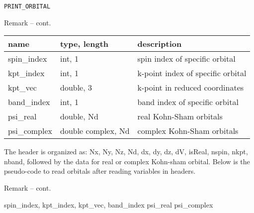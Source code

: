 \begin{frame}[allowframebreaks]{\texttt{PRINT\_ORBITAL}}
\begin{block}{Remark -- cont.}
\begin{table}[]
\begin{tabular}{|m{1.7cm}|m{3.2cm}|m{5cm}|}
\hline
name         & type, length       & description 
                     \\ \hline
spin\_index  & int, 1             & spin index of specific orbital                                                                                \\ \hline
kpt\_index   & int, 1             & k-point index of specific orbital 
                     \\ \hline
kpt\_vec     & double, 3          & k-point in reduced coordinates                                                                                \\ \hline
band\_index  & int, 1             & band index of specific orbital                                                                                \\ \hline
psi\_real    & double, Nd         & real Kohn-Sham orbitals                                                                                       \\ \hline
psi\_complex & double complex, Nd & complex Kohn-Sham orbitals                                                                                    \\ \hline
\end{tabular}
\end{table}
The header is organized as: Nx, Ny, Nz, Nd, dx, dy, dz, dV, isReal, nspin, nkpt, nband, followed by the data for real or complex Kohn-sham orbital. Below is the pseudo-code to read orbitals after reading variables in headers. 
\end{block}

\begin{block}{Remark -- cont.}
\begin{algorithm}[H]
\begin{algorithmic}
    \State spin\_index, kpt\_index, kpt\_vec, band\_index
        \State psi\_real
    \Else
        \State psi\_complex
    \EndIf
\EndFor
\EndFor
\EndFor
\end{algorithmic}
\end{algorithm}
\end{block}

\end{frame}



